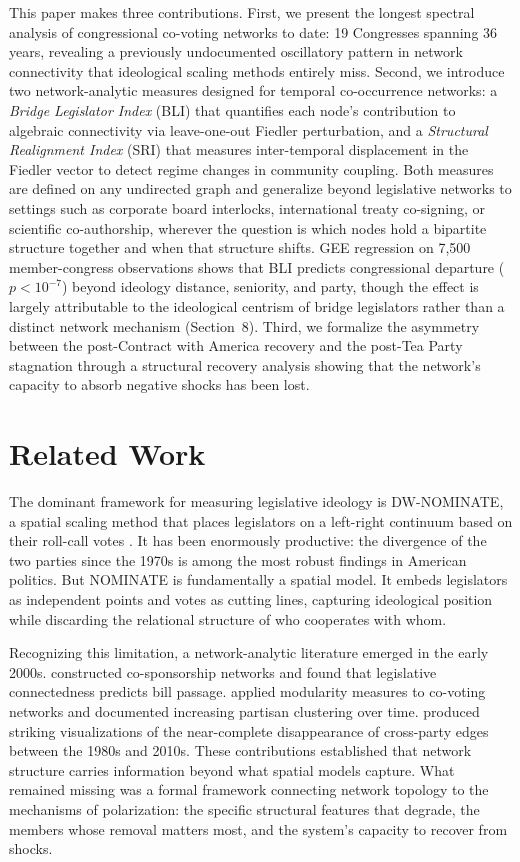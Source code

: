 \documentclass[12pt, a4paper]{article}
\begin{document}
This paper makes three contributions. First, we present the longest spectral analysis of congressional co-voting networks to date: 19 Congresses spanning 36 years, revealing a previously undocumented oscillatory pattern in network connectivity that ideological scaling methods entirely miss. Second, we introduce two network-analytic measures designed for temporal co-occurrence networks: a \textit{Bridge Legislator Index} (BLI) that quantifies each node's contribution to algebraic connectivity via leave-one-out Fiedler perturbation, and a \textit{Structural Realignment Index} (SRI) that measures inter-temporal displacement in the Fiedler vector to detect regime changes in community coupling. Both measures are defined on any undirected graph and generalize beyond legislative networks to settings such as corporate board interlocks, international treaty co-signing, or scientific co-authorship, wherever the question is which nodes hold a bipartite structure together and when that structure shifts. GEE regression on 7,500 member-congress observations shows that BLI predicts congressional departure ($p < 10^{-7}$) beyond ideology distance, seniority, and party, though the effect is largely attributable to the ideological centrism of bridge legislators rather than a distinct network mechanism (Section~8). Third, we formalize the asymmetry between the post-Contract with America recovery and the post-Tea Party stagnation through a structural recovery analysis showing that the network's capacity to absorb negative shocks has been lost.

\section{Related Work}

The dominant framework for measuring legislative ideology is DW-NOMINATE, a spatial scaling method that places legislators on a left-right continuum based on their roll-call votes \citep{poole1985, poole2017}. It has been enormously productive: the divergence of the two parties since the 1970s is among the most robust findings in American politics. But NOMINATE is fundamentally a spatial model. It embeds legislators as independent points and votes as cutting lines, capturing ideological position while discarding the relational structure of who cooperates with whom.

Recognizing this limitation, a network-analytic literature emerged in the early 2000s. \citet{fowler2006a} constructed co-sponsorship networks and found that legislative connectedness predicts bill passage. \citet{waugh2009} applied modularity measures to co-voting networks and documented increasing partisan clustering over time. \citet{andris2015} produced striking visualizations of the near-complete disappearance of cross-party edges between the 1980s and 2010s. These contributions established that network structure carries information beyond what spatial models capture. What remained missing was a formal framework connecting network topology to the mechanisms of polarization: the specific structural features that degrade, the members whose removal matters most, and the system's capacity to recover from shocks.
\end{document}
